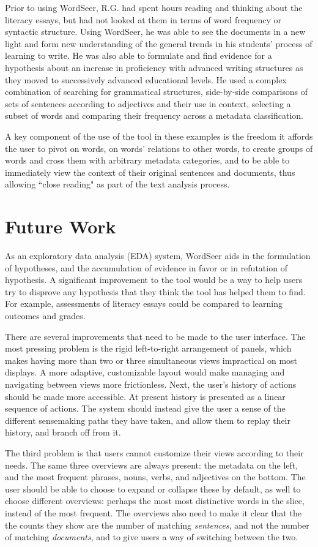\documentclass{sig-alternate}
\begin{document}
Prior to using WordSeer, R.G. had spent hours reading and thinking about the literacy essays, but had not looked at them in terms of word frequency or syntactic structure.  Using WordSeer, he was able to see the documents in a new light and form new  understanding of the general trends in his students' process of learning to write.   He was also able to formulate and find evidence for a hypothesis about an increase in proficiency with advanced writing structures as they moved to successively advanced educational levels.   He used a complex combination of searching for grammatical structures, side-by-side comparisons of sets of sentences according to adjectives and their use in context, selecting a subset of words and comparing their frequency across a metadata classification.  

A key component of the use of the tool in these examples is the freedom it affords the user to pivot on words, on words' relations to other words, to create groups of words and cross them with arbitrary metadata categories, and to be able to immediately view  the context of their original sentences and documents, thus allowing ``close reading" as part of the text analysis process.

\section{Future Work}
As an exploratory data analysis (EDA) system, WordSeer aids in the formulation of hypotheses, and the accumulation of evidence in favor or in refutation of hypothesis. A significant improvement to the tool would be a way to help users try to disprove any hypothesis that they think the tool has helped them to find. For example, assessments of literacy essays could be compared to learning outcomes and grades.

There are several improvements that need to be made to the user interface. The most pressing problem is the rigid left-to-right arrangement of panels, which makes having more than two or three simultaneous views impractical on most displays. A more adaptive, customizable layout would make managing and navigating between views more frictionless. Next, the user's history of actions should be made more accessible. At present history is presented as a linear sequence of actions. The system should instead give the user a sense of the different sensemaking paths they have taken, and allow them to replay their history, and branch off from it.

The third problem is that users cannot customize their views according to their needs. The same three overviews are always present: the metadata on the left, and the most frequent phrases, nouns, verbs, and adjectives on the bottom. The user should be able to choose to expand or collapse these by default, as well to choose different overviews: perhaps the most most distinctive words in the slice, instead of the most frequent. The overviews also need to make it clear that the the counts they show are the number of matching \emph{sentences}, and not the number of matching \emph{documents}, and to give users a way of switching between the two.
\end{document}
